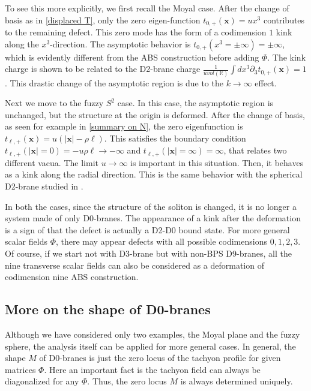 \documentclass[12pt]{article}
\numberwithin{equation}{section}
\def\real{\mathbb{R}}
\begin{document}
To see this more explicitly, we first recall the Moyal case.
After the change of basis as in \eqref{displaced T}, only the zero eigen-function 
$t_{0,+}(\boldsymbol{x})=ux^3$ contributes to the remaining defect.
This zero mode has the form of a codimension $1$ kink along the $x^3$-direction.
The asymptotic behavior is $t_{0,+}(x^3=\pm \infty)=\pm \infty$, which is evidently 
different from the ABS construction before adding $\Phi$.
The kink charge is shown to be related to the D2-brane charge 
$\frac{1}{u vol(\real)} \int dx^3 \partial_3 t_{0,+}(\boldsymbol{x})=1$.
This drastic change of the asymptotic region is due to the $k\to \infty$ effect.

Next we move to the fuzzy $S^2$ case.
In this case, the asymptotic region is unchanged, 
but the structure at the origin is deformed.
After the change of basis, as seen for example in \eqref{summary on N}, 
the zero eigenfunction is 
$t_{\ell,+}(\boldsymbol{x})=u(|\boldsymbol{x}|-\rho\ell)$.
This satisfies the boundary condition 
$t_{\ell,+}(|\boldsymbol{x}| =0)=-u\rho\ell \to -\infty$
and $t_{\ell,+}(|\boldsymbol{x}| =\infty)=\infty$, that relates two different vacua.
The limit $u\to \infty$ is important in this situation.
Then, it behaves as a kink along the radial direction.
This is the same behavior {with the spherical D2-brane studied in \cite{Asakawa2017}.}
 
In both the cases, since the structure of the soliton is changed, 
it is no longer a system made of only D0-branes.
The appearance of a kink after the deformation is a sign 
of that the defect is 
actually a D2-D0 bound state.
For more general scalar fields $\Phi$, there may appear defects with all possible codimensions $0,1,2,3$.
Of course, if we start not with D3-brane but with non-BPS D9-branes, 
 all {the nine} transverse scalar fields can also be considered as a deformation of codimension nine ABS construction.

\subsection{More on the shape of D0-branes}

Although we have considered only two examples, 
the Moyal plane and the fuzzy sphere,
the analysis itself can be applied for more general cases.
In general, the shape $M$ of D0-branes 
is just the zero locus of the tachyon profile for given matrices $\Phi$.
Here an important fact is the tachyon field can always be diagonalized for any $\Phi$.
Thus, the zero locus $M$ is always determined uniquely.
\end{document}
